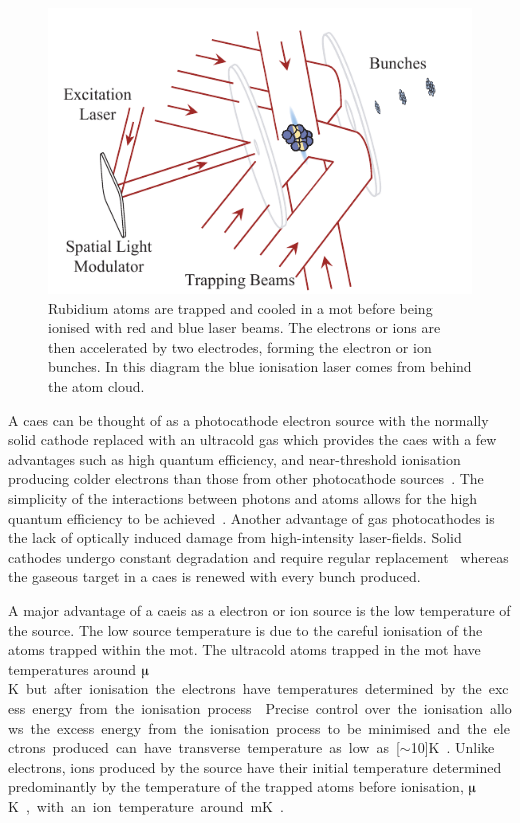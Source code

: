 \begin{figure}
    \center
    \includegraphics{0intro/Figs/simple_caeis_schem.pdf}
    \caption[Simplified cold atom ion and electron source schematic.]{Rubidium atoms are trapped and cooled in a \gls{mot} before being ionised with red and blue laser beams. The electrons or ions are then accelerated by two electrodes, forming the electron or ion bunches. In this diagram the blue ionisation laser comes from behind the atom cloud.}
    \label{figure:simple_caeis_schem}
\end{figure}

A \gls{caes} can be thought of as a photocathode electron source with the normally solid cathode replaced with an ultracold gas which provides the \gls{caes} with a few advantages such as high quantum efficiency, and near-threshold ionisation producing colder electrons than those from other photocathode sources~\cite{engelen_effective_2014}.
The simplicity of the interactions between photons and atoms allows for the high quantum efficiency to be achieved~\cite{baranov_field_1994}.
Another advantage of gas photocathodes is the lack of optically induced damage from high-intensity laser-fields.
Solid cathodes undergo constant degradation and require regular replacement~\cite{dowell_results_1995} whereas the gaseous target in a \gls{caes} is renewed with every bunch produced.

A major advantage of a \gls{caeis} as a electron or ion source is the low temperature of the source.
The low source temperature is due to the careful ionisation of the atoms trapped within the \gls{mot}.
The ultracold atoms trapped in the \gls{mot} have temperatures around \unit[100]{$\muup$K} but after ionisation the electrons have temperatures determined by the excess energy from the ionisation process~\cite{engelen_high-coherence_2013,engelen_analytical_2014,sparkes_high-coherence_2014,speirs_identification_2017}.
Precise control over the ionisation allows the excess energy from the ionisation process to be minimised and the electrons produced can have transverse temperature as low as \unit[$\sim$10]{K}~\cite{saliba_spatial_2012}.
Unlike electrons, ions produced by the source have their initial temperature determined predominantly by the temperature of the trapped atoms before ionisation, \unit[100]{$\muup$K}, with an ion temperature around \unit[1]{mK}~\cite{debernardi_measurement_2011,murphy_detailed_2014}.

